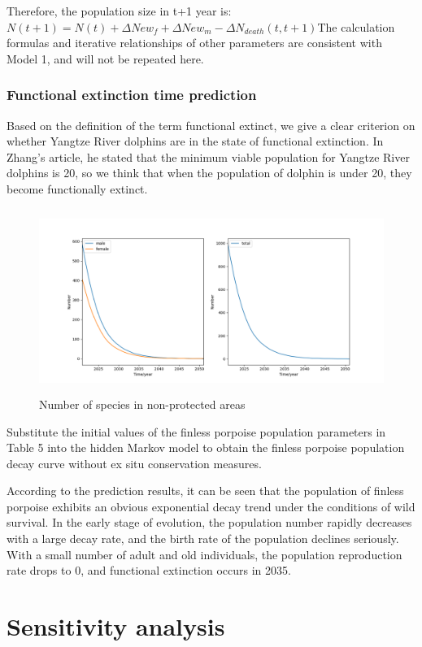 \documentclass[12pt]{article}  %
\begin{document}
Therefore, the population size in t+1 year is:
$N(t+1)=N(t)+\Delta Ne{{w}_{f}}+\Delta Ne{{w}_{m}}-\Delta {{N}_{death}}(t,t+1)$The calculation formulas and iterative relationships of other parameters are consistent with Model 1, and will not be repeated here.

\subsubsection{Functional extinction time prediction}
Based on the definition of the term functional extinct, we give a clear criterion on whether Yangtze River dolphins are in the state of functional extinction.
In Zhang's article, he stated that the minimum viable population for Yangtze River dolphins is 20, so we think that when the population of dolphin is under 20, they become functionally extinct.
\begin{figure}[htbp]%
	\small
	\centering
	\includegraphics[height=6cm,width=13cm]{figures/notpro.png}%
	\caption{Number of species in non-protected areas}%
\end{figure}
Substitute the initial values of the finless porpoise population parameters in Table 5 into the hidden Markov model to obtain the finless porpoise population decay curve without ex situ conservation measures.

According to the prediction results, it can be seen that the population of finless porpoise exhibits an obvious exponential decay trend under the conditions of wild survival. In the early stage of evolution, the population number rapidly decreases with a large decay rate, and the birth rate of the population declines seriously. With a small number of adult and old individuals, the population reproduction rate drops to 0, and functional extinction occurs in 2035.

\section{Sensitivity analysis}
\end{document}
